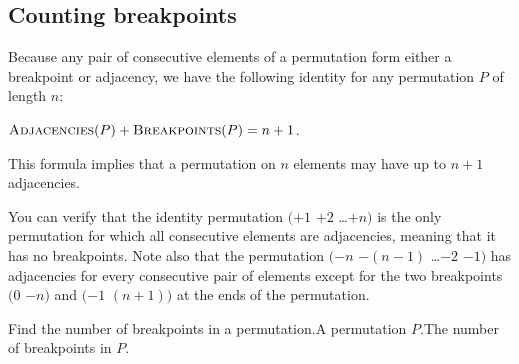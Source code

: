 \subsection{Counting breakpoints}
\label{subsec:counting_breakpoints}

Because any pair of consecutive elements of a permutation form either a breakpoint or adjacency, we have the following identity for any permutation $P$ of length $n$:

\begin{center}
$\text{\scshape Adjacencies}(P) + \text{\scshape Breakpoints}(P) = n+1$.
\end{center}

\noindent This formula implies that a permutation on $n$ elements may have up to $n+1$ adjacencies.\\

\begin{qbox}\end{qbox}

\noindent You can verify that the identity permutation $(+1$ $+2$ \ldots $+n)$ is the only permutation for which all consecutive elements are adjacencies, meaning that it has no breakpoints. Note also that the permutation $(-n$  $-(n-1)$ \ldots $-2$ $-1)$ has adjacencies for every consecutive pair of elements except for the two breakpoints $(0$ $-n)$ and $(-1$ $(n+1))$ at the ends of the permutation.\\

\begin{exercise}\end{exercise}

\fudgespace

\begin{problem}{Find the number of breakpoints in a permutation.}{A permutation $P$.}{The number of breakpoints in $P$.}
\protect{}
\end{problem}

\fudgespace

\begin{qbox}\end{qbox}


